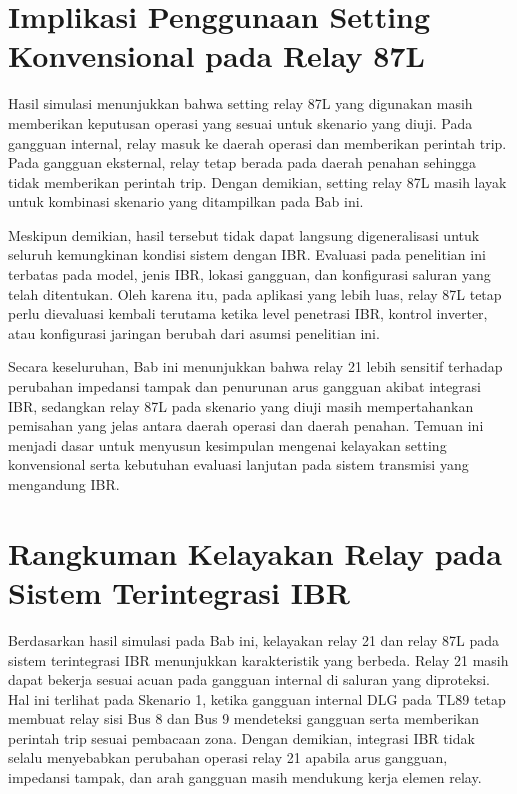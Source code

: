 \section{Implikasi Penggunaan Setting Konvensional pada Relay 87L}

Hasil simulasi menunjukkan bahwa setting relay 87L yang digunakan masih memberikan keputusan operasi yang sesuai untuk skenario yang diuji. Pada gangguan internal, relay masuk ke daerah operasi dan memberikan perintah trip. Pada gangguan eksternal, relay tetap berada pada daerah penahan sehingga tidak memberikan perintah trip. Dengan demikian, setting relay 87L masih layak untuk kombinasi skenario yang ditampilkan pada Bab ini.

Meskipun demikian, hasil tersebut tidak dapat langsung digeneralisasi untuk seluruh kemungkinan kondisi sistem dengan IBR. Evaluasi pada penelitian ini terbatas pada model, jenis IBR, lokasi gangguan, dan konfigurasi saluran yang telah ditentukan. Oleh karena itu, pada aplikasi yang lebih luas, relay 87L tetap perlu dievaluasi kembali terutama ketika level penetrasi IBR, kontrol inverter, atau konfigurasi jaringan berubah dari asumsi penelitian ini.

Secara keseluruhan, Bab ini menunjukkan bahwa relay 21 lebih sensitif terhadap perubahan impedansi tampak dan penurunan arus gangguan akibat integrasi IBR, sedangkan relay 87L pada skenario yang diuji masih mempertahankan pemisahan yang jelas antara daerah operasi dan daerah penahan. Temuan ini menjadi dasar untuk menyusun kesimpulan mengenai kelayakan setting konvensional serta kebutuhan evaluasi lanjutan pada sistem transmisi yang mengandung IBR.

\section{Rangkuman Kelayakan Relay pada Sistem Terintegrasi IBR}

Berdasarkan hasil simulasi pada Bab ini, kelayakan relay 21 dan relay 87L pada sistem terintegrasi IBR menunjukkan karakteristik yang berbeda. Relay 21 masih dapat bekerja sesuai acuan pada gangguan internal di saluran yang diproteksi. Hal ini terlihat pada Skenario 1, ketika gangguan internal DLG pada TL89 tetap membuat relay sisi Bus 8 dan Bus 9 mendeteksi gangguan serta memberikan perintah trip sesuai pembacaan zona. Dengan demikian, integrasi IBR tidak selalu menyebabkan perubahan operasi relay 21 apabila arus gangguan, impedansi tampak, dan arah gangguan masih mendukung kerja elemen relay.

